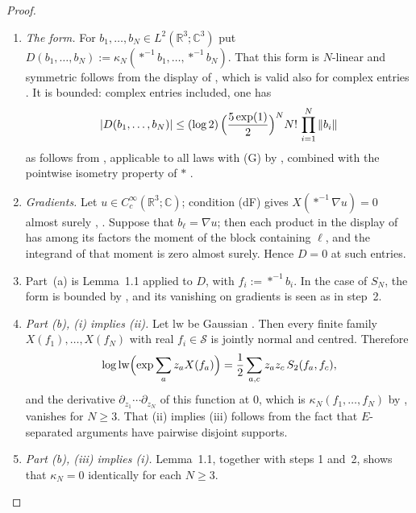 \documentclass[11pt,letterpaper,reqno]{amsart}
\theoremstyle{definition}
\begin{document}
\begin{proof}
\begin{enumerate}
\item[1.] \emph{The form.}
For $b_1,\dots,b_N\in L^2(\mathbb{R}^3;\mathbb{C}^3)$ put $D(b_1,\dots,b_N):=\kappa_N(\ast^{-1}b_1,\dots,\ast^{-1}b_N)$.
That this form is $N$-linear and symmetric follows from the display of \cite[Notation~(n5)]{QEDIII}, which is valid also for complex entries \cite[Notation~(n8); Chapter~45-1, Part~F, Lemma~F.1]{QEDIII}.
It is bounded: complex entries included, one has
\begin{equation*}
|D(b_1,\dots,b_N)|\le(\log2)\,\Bigl(\frac{5\exp(1)}{2}\Bigr)^{N}N!\,\prod_{i=1}^{N}\|b_i\|
\end{equation*}
as follows from \cite[Proposition~7.10\,(7)]{QEDI}, applicable to all laws with (G) by \cite[Proposition~45.1\,(1),~(11)]{QEDIII}, combined with the pointwise isometry property of $\ast$ \cite[Definition~14.1]{QEDII}.
\item[2.] \emph{Gradients.}
Let $u\in C_c^\infty(\mathbb{R}^3;\mathbb{C})$; condition (dF) gives $X(\ast^{-1}\nabla u)=0$ almost surely \cite[Definition~14.2\,(a)]{QEDII}, \cite[Proposition~45.1\,(10)]{QEDIII}.
Suppose that $b_\ell=\nabla u$; then each product in the display of \cite[Notation~(n5)]{QEDIII} has among its factors the moment of the block containing $\ell$, and the integrand of that moment is zero almost surely.
Hence $D=0$ at such entries.
\item[3.]
Part~(a) is Lemma~1.1 applied to $D$, with $f_i:=\ast^{-1}b_i$.
In the case of $S_N$, the form is bounded by \cite[Lemma~14.3\,(b)]{QEDII}, and its vanishing on gradients is seen as in step~2.
\item[4.] \emph{Part (b), (i) implies (ii).}
Let $\mathrm{lw}$ be Gaussian \cite[Notation~(n6)]{QEDIII}.
Then every finite family $X(f_1),\dots,X(f_N)$ with real $f_i\in\mathcal S$ is jointly normal \cite[Section~2.5]{QEDI} and centred.
Therefore
\begin{equation*}
\log\mathrm{lw}\Bigl(\exp\sum_az_aX(f_a)\Bigr)=\frac12\sum_{a,c}z_az_c\,S_2(f_a,f_c),
\end{equation*}
and the derivative $\partial_{z_1}\cdots\partial_{z_N}$ of this function at $0$, which is $\kappa_N(f_1,\dots,f_N)$ by \cite[Notation~(n5)]{QEDIII}, vanishes for $N\ge3$.
That (ii) implies (iii) follows from the fact that $E$-separated arguments have pairwise disjoint supports.
\item[5.] \emph{Part (b), (iii) implies (i).}
Lemma~1.1, together with steps 1 and~2, shows that $\kappa_N=0$ identically for each $N\ge3$.

\end{enumerate}
\end{proof}
\end{document}
